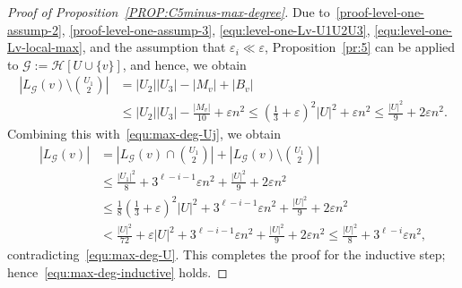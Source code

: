 \documentclass[11pt,a4paper]{article}
\theoremstyle{remark}
\newcommand{\C}[1]{\mathcal{#1}}
\begin{document}
\begin{proof}[Proof of Proposition~\ref{PROP:C5minus-max-degree}]
    Due to~\ref{proof-level-one-assump-2}, \ref{proof-level-one-assump-3}, \eqref{equ:level-one-Lv-U1U2U3}, \eqref{equ:level-one-Lv-local-max}, and the assumption that $\varepsilon_i \ll \varepsilon$, Proposition~\ref{pr:5} can be applied to $\C G:=\mathcal{H}[U \cup \{v\}]$, and hence, we obtain 
    \begin{align*}
        \left|L_{\C G}(v) \setminus \binom{U_1}{2}\right|
        & = |U_2||U_3| - |M_v| + |B_v| \\
        & \le |U_2||U_3| -\frac{|M_v|}{10} + \varepsilon n^2  
         \le \left(\frac{1}{3} + \varepsilon\right)^2 |U|^2 + \varepsilon n^2 
        \le \frac{|U|^2}{9} + 2\varepsilon n^2.
    \end{align*}
    Combining this with~\eqref{equ:max-deg-Uj}, we obtain 
    \begin{align*}
        |L_{\C G}(v)|
        & = \left|L_{\C G}(v) \cap \binom{U_1}{2}\right| + \left|L_{\C G}(v) \setminus \binom{U_1}{2}\right|  \\
        & \le \frac{|U_1|^2}{8} + 3^{\ell-i-1} \varepsilon n^2 + \frac{|U|^2}{9} + 2\varepsilon n^2  \\
        & \le \frac{1}{8}\left(\frac{1}{3} + \varepsilon \right)^2 |U|^2  + 3^{\ell-i-1} \varepsilon n^2 + \frac{|U|^2}{9} + 2\varepsilon n^2  \\
        & < \frac{|U|^2}{72} + \varepsilon |U|^2 + 3^{\ell-i-1} \varepsilon n^2 + \frac{|U|^2}{9} + 2\varepsilon n^2  
         \le \frac{|U|^2}{8} + 3^{\ell-i} \varepsilon n^2,  
    \end{align*}
    contradicting~\eqref{equ:max-deg-U}. 
    This completes the proof for the inductive step; hence~\eqref{equ:max-deg-inductive} holds. 
    

\end{proof}
\end{document}
